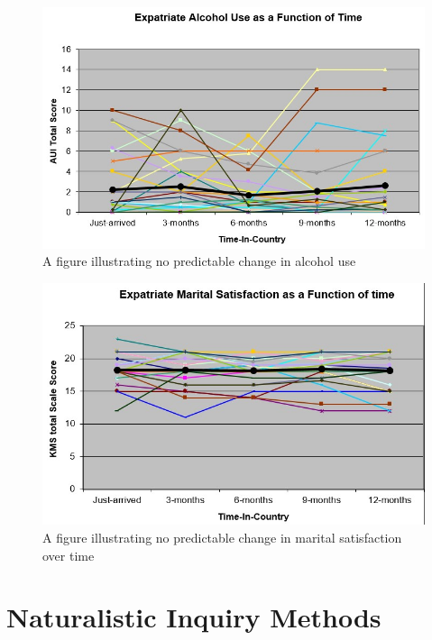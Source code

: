 \documentclass[
  english,
]{book}
\begin{document}
\begin{figure}
\centering
\includegraphics{images/Qualitative/expatAlcohol.jpg}
\caption{A figure illustrating no predictable change in alcohol use}
\end{figure}

\begin{figure}
\centering
\includegraphics{images/Qualitative/expatKMS.jpg}
\caption{A figure illustrating no predictable change in marital satisfaction over time}
\end{figure}

\hypertarget{naturalistic-inquiry-methods}{%
\section{Naturalistic Inquiry Methods}\label{naturalistic-inquiry-methods}}
\end{document}

